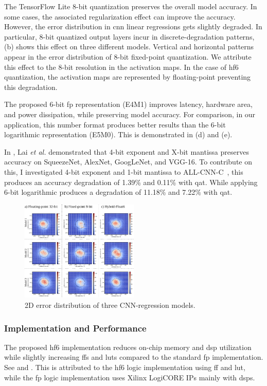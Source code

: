 The TensorFlow Lite 8-bit quantization preserves the overall model accuracy. In some cases, the associated regularization effect can improve the accuracy. However, the error distribution in \gls{cnn} linear regressions gets slightly degraded. In particular, 8-bit quantized output layers incur in discrete-degradation patterns, (b) shows this effect on three different models. Vertical and horizontal patterns appear in the error distribution of 8-bit fixed-point quantization. We attribute this effect to the 8-bit resolution in the activation maps. In the case of \gls{hf6} quantization, the activation maps are represented by floating-point preventing this degradation.

The proposed 6-bit \gls{fp} representation (E4M1) improves latency, hardware area, and power dissipation, while preserving model accuracy. For comparison, in our application, this number format produces better results than the 6-bit logarithmic representation (E5M0). This is demonstrated in (d) and (e).

In \cite{lai2017deep}, Lai \textit{et al.} demonstrated that 4-bit exponent and X-bit mantissa preserves accuracy on SqueezeNet, AlexNet, GoogLeNet, and VGG-16. To contribute on this, I investigated 4-bit exponent and 1-bit mantissa to ALL-CNN-C~\cite{springenberg2014striving}, this produces an accuracy degradation of 1.39\% and 0.11\% with \gls{qat}. While applying 6-bit logarithmic produces a degradation of 11.18\% and 7.22\% with \gls{qat}.

\begin{figure}[t!]
	\centering
	\includegraphics[width=0.5\textwidth]{./chapters/cnn_accelerator/figures/histograms/2D_error_distribtion.pdf}
	\caption{2D error distribution of three CNN-regression models.}
	\label{fig:2d_error_distribtion}
\end{figure}

\subsubsection{Implementation and Performance}
The proposed \gls{hf6} implementation reduces on-chip memory and \gls{dsp} utilization while slightly increasing \glspl{ff} and \glspl{lut} compared to the standard \gls{fp} implementation. See  and . This is attributed to the \gls{hf6} logic implementation using \gls{ff} and \gls{lut}, while the \gls{fp} logic implementation uses Xilinx LogiCORE IPs mainly with \glspl{dsp}.


